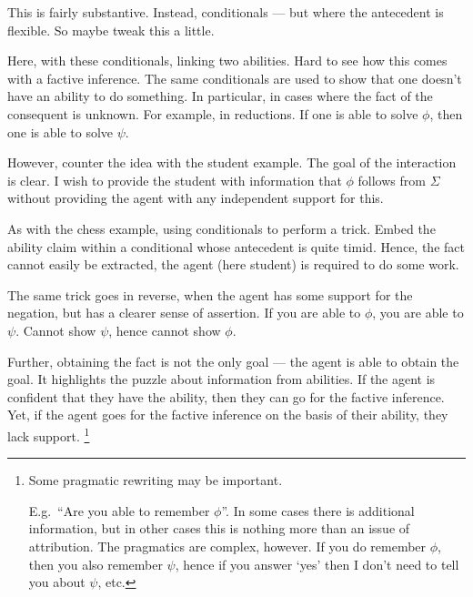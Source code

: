 \documentclass[10pt]{article}
\begin{document}
\begin{note}[Embedded]
  This is fairly substantive.
  Instead, conditionals --- but where the antecedent is flexible.
  So maybe tweak this a little.

  Here, with these conditionals, linking two abilities.
  Hard to see how this comes with a factive inference.
  The same conditionals are used to show that one doesn't have an ability to do something.
  In particular, in cases where the fact of the consequent is unknown.
  For example, in reductions.
  If one is able to solve \(\phi\), then one is able to solve \(\psi\).

  


  However, counter the \citeauthor{Emms:2000aa} idea with the student example.
  The goal of the interaction is clear.
  I wish to provide the student with information that \(\phi\) follows from \(\Sigma\) without providing the agent with any independent support for this.

  As with the chess example, using conditionals to perform a trick.
  Embed the ability claim within a conditional whose antecedent is quite timid.
  Hence, the fact cannot easily be extracted, the agent (here student) is required to do some work.

  The same trick goes in reverse, when the agent has some support for the negation, but has a clearer sense of assertion.
  If you are able to \(\phi\), you are able to \(\psi\).
  Cannot show \(\psi\), hence cannot show \(\phi\).



  

  Further, obtaining the fact is not the only goal --- the agent is able to obtain the goal.
  It highlights the puzzle about information from abilities.
  If the agent is confident that they have the ability, then they can go for the factive inference.
  Yet, if the agent goes for the factive inference on the basis of their ability, they lack support.\nolinebreak
  \footnote{
    Some pragmatic rewriting may be important.

    E.g.\ ``Are you able to remember \(\phi\)''.
    In some cases there is additional information, but in other cases this is nothing more than an issue of attribution.
    The pragmatics are complex, however.
    If you do remember \(\phi\), then you also remember \(\psi\), hence if you answer `yes' then I don't need to tell you about \(\psi\), etc.
  }
\end{note}

\begin{note}[No support]

\end{note}
\end{document}
